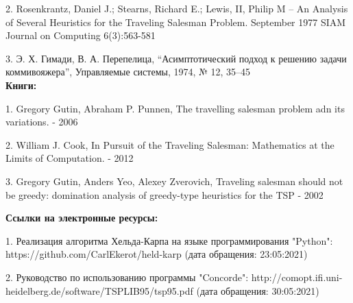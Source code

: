 \documentclass[a4paper, 14pt]{extarticle}
\begin{document}
2. Rosenkrantz, Daniel J.; Stearns, Richard E.; Lewis, II, Philip M -- An Analysis of Several Heuristics for the Traveling Salesman Problem. September 1977 SIAM Journal on Computing 6(3):563-581

3. 	Э. Х. Гимади, В. А. Перепелица, “Асимптотический подход к решению задачи коммивояжера”, Управляемые системы, 1974, № 12, 35–45\\


\textbf{Книги:}

1. Gregory Gutin, Abraham P. Punnen, The travelling salesman problem adn its variations. - 2006

2. William J. Cook, In Pursuit of the Traveling Salesman: Mathematics at the Limits of Computation. - 2012

3. Gregory Gutin, Anders Yeo, Alexey Zverovich, Traveling salesman should not be greedy: domination analysis of greedy-type heuristics for the TSP - 2002

\textbf{Ссылки на электронные ресурсы:}

1. Реализация алгоритма Хельда-Карпа на языке программирования "Python": https://github.com/CarlEkerot/held-karp (дата обращения: 23:05:2021)

2. Руководство по использованию программы "Concorde": http://comopt.ifi.uni-heidelberg.de/software/TSPLIB95/tsp95.pdf (дата обращения: 30:05:2021)
\end{document}

